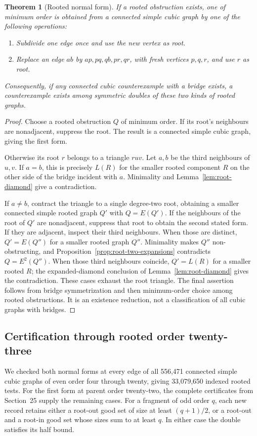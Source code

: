 \documentclass[11pt]{article}
\newtheorem{theorem}{Theorem}[section]
\begin{document}
\begin{theorem}[Rooted normal form]\label{thm:root-normal-form}
If a rooted obstruction exists, one of minimum order is obtained
from a connected simple cubic graph by one of the following operations:
\begin{enumerate}
\item Subdivide one edge once and use the new vertex as root.
\item Replace an edge $ab$ by $ap,pq,qb,pr,qr$, with fresh vertices
$p,q,r$, and use $r$ as root.
\end{enumerate}
Consequently, if any connected cubic counterexample with a bridge
exists, a counterexample exists among symmetric doubles of these
two kinds of rooted graphs.
\end{theorem}
\begin{proof}
Choose a rooted obstruction $Q$ of minimum order. If its root's
neighbours are nonadjacent, suppress the root. The result is a
connected simple cubic graph, giving the first form.

Otherwise its root $r$ belongs to a triangle $ruv$. Let $a,b$ be
the third neighbours of $u,v$. If $a=b$, this is precisely $L(R)$
for the smaller rooted component $R$ on the other side of the
bridge incident with $a$. Minimality and Lemma~\ref{lem:root-diamond}
give a contradiction.

If $a\ne b$, contract the triangle to a single degree-two root,
obtaining a smaller connected simple rooted graph $Q'$ with
$Q=E(Q')$. If the neighbours of the root of $Q'$ are nonadjacent,
suppress that root to obtain the second stated form.
If they are adjacent, inspect their third neighbours. When those
are distinct, $Q'=E(Q'')$ for a smaller rooted graph $Q''$.
Minimality makes $Q''$ non-obstructing, and
Proposition~\ref{prop:root-two-expansions} contradicts $Q=E^2(Q'')$.
When those third neighbours coincide, $Q'=L(R)$ for a smaller
rooted $R$; the expanded-diamond conclusion of
Lemma~\ref{lem:root-diamond} gives the contradiction.
These cases exhaust the root triangle. The final assertion follows
from bridge symmetrization and then minimum-order choice among rooted
obstructions. It is an existence reduction, not a classification of
all cubic graphs with bridges.
\end{proof}

\subsection{Certification through rooted order twenty-three}
We checked both normal forms at every edge of all 556,471 connected
simple cubic graphs of even order four through twenty, giving
33,079,650 indexed rooted tests. For the first form at
parent order twenty-two, the complete certificates from Section~25
supply the remaining cases. For a fragment of odd order $q$, each
new record retains either a root-out good set of size at least
$(q+1)/2$, or a root-out and a root-in good set whose sizes sum to
at least $q$. In either case the double satisfies its half bound.
\end{document}
